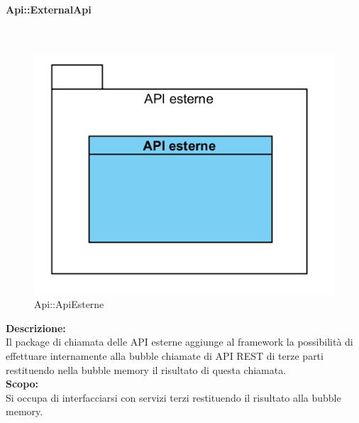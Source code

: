 \begin{samepage}
\paragraph{Api\-::External\-Api}\label{api-esterne}\mbox{}\\
\begin{figure}[H]
	\centering
	\includegraphics[width=14cm]{diagrammi_img/classi_e_package/api_esterne.png}
	\caption{Api\-::ApiEsterne}
\end{figure}
\end{samepage}
\textbf{Descrizione:}\\ 
Il package di chiamata delle API esterne aggiunge al framework la possibilità di effettuare internamente alla bubble chiamate di API REST di terze parti restituendo nella bubble memory il risultato di questa chiamata. \\
\textbf{Scopo:}\\
Si occupa di interfacciarsi con servizi terzi restituendo il risultato alla bubble memory.\\

